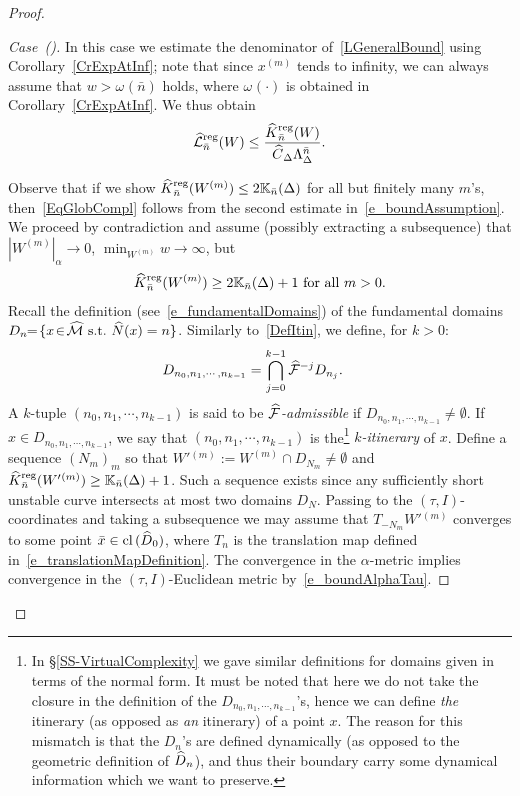 \documentclass[AHL, Unicode, longabstracts,published]{cedram}
\newcommand{\st}{\ \text{s.t.}\ }
\newcommand{\cl}[1]{\mathrm{cl}\,#1}
\newcommand{\LC}{\mathbb{K}}
\newcommand{\cm}{\mathcal{F}}
\newcommand{\csp}{\mathcal{M}}
\newcommand{\cmp}{\hat\cm}
\newcommand{\cspi}{\widehat{\csp}}
\newcommand{\brn}{\bar{n}}
\newcommand{\brx}{\bar{x}}
\newcommand{\hkreg}{\hat{K}^\text{reg}}
\newcommand{\hzreg}{\hat{\cL}^\text{reg}}
\newcommand{\law}[1]{\omega_{#1}}
\newcommand{\adm}{_{\alpha^{+}}}
\newcommand{\admName}{\alpha^{+}}
\newcommand{\Np}{\hat N}
\newcommand{\cL}{\mathcal{L}}
\newcommand{\privSeq}[2]{#1^{(#2)}}
\newcommand{\Wseq}[1]{\privSeq{W}{#1}}
\newcommand{\Wpseq}[1]{\privSeq{W'{}}{#1}}
\newcommand{\Dom}{D}
\newcommand{\hDom}{\hat D}
\renewcommand{\admName}{\alpha}
\renewcommand{\adm}{_{\alpha}}
\newcounter{casecount}
\renewcommand*\thecasecount{(\alph{casecount})}
\newenvironment{case}{\refstepcounter{casecount}\begin{proof}[{Case~\thecasecount}]}{\let\qed\relax\end{proof}}
\let\oldhat\hat
\renewcommand*{\hat}[1]{\mathchoice{\widehat{#1}}{\widehat{#1}}{\oldhat{#1}}{\oldhat{#1}}}
\begin{document}
\begin{proof}
\begin{case}
In this case we estimate the denominator of~\eqref{LGeneralBound} using Corollary~\ref{CrExpAtInf}; note that since $x^{(m)}$ tends to infinity, we can always assume that $w > \law{}(\bar n)$ holds, where $\law{}(\cdot)$ is obtained in Corollary~\ref{CrExpAtInf}. We thus obtain
\begin{align*}
\hzreg_{\brn}(W) \leq \frac{\hkreg_{\brn}(W)}{\hat{C}_{\Delta} \Lambda_\Delta^{\brn}}.
\end{align*}

Observe that if we show $\hkreg_{\bar n}(W^{(m)}) \leq 2\LC_{\bar n}(\Delta)$ for all but finitely many $m$'s, then~\eqref{EqGlobCompl} follows from the second estimate in~\eqref{e_boundAssumption}. We proceed by contradiction and assume (possibly extracting a subsequence) that $|\Wseq{m}|\adm\to 0$, $ \min_{\Wseq{m}} w\to\infty$, but
\begin{align*}
\hkreg_{\bar n}(\Wseq{m})\geq 2\LC_{\bar n}(\Delta)+1 \text{ for all }m > 0.
\end{align*}
Recall the definition (see~\eqref{e_fundamentalDomains}) of the fundamental domains $\Dom_n\!\!=\! \{x\!\in\!\cspi\st \Np(x) = n\}$. Similarly to~\eqref{DefItin}, we define, for $k > 0$:
\begin{align*}
\Dom_{n_0,n_1,\cdots,n_{k-1}} &= \bigcap_{j = 0}^{k-1}\cmp^{-j}\Dom_{n_j}.
\end{align*}
A $k$-tuple $(n_0,n_1,\!\cdots\!,n_{k-1})$ is said to be
\emph{$\cmp$-admissible} if $\Dom_{n_0,n_1,\cdots,n_{k-1}}\!\!\ne\!\emptyset$. If $x\in\Dom_{n_0,n_1,\cdots,n_{k-1}}$, we say that $(n_0,n_1,\cdots,n_{k-1})$ is the\footnote{In
\S\ref{SS-VirtualComplexity} we gave similar definitions for domains given in terms of the normal form. It must be noted that here we do not take the closure in the definition of the $\Dom_{n_0,n_1,\cdots,n_{k-1}}$'s, hence we can define \emph{the} itinerary (as opposed as \emph{an} itinerary) of a point $x$. The reason for this mismatch is that the $\Dom_n$'s are defined dynamically (as opposed to the geometric definition of $\hDom_n$), and thus their boundary carry some dynamical information which we want to preserve.} 
\emph{$k$-itinerary} of $x$. Define a sequence $(N_m)_m$ so that $\Wpseq{m} \!\!:= \Wseq{m}\cap D_{N_m}\ne\emptyset$ and $\hkreg_{\bar n}(\Wpseq{m})\ge \LC_{\bar n}(\Delta)+1$. Such a sequence exists since any sufficiently short unstable curve intersects at most two domains $D_N$. Passing to the $(\tau, I)$-coordinates and taking a subsequence we may assume that $T_{-N_m} \Wpseq{m}$ converges to some point $\brx\in \cl(\hDom_0)$, where $T_n$ is the translation map defined in~\eqref{e_translationMapDefinition}. The convergence in the $\admName$-metric implies convergence in the $(\tau,I)$-Euclidean metric by~\eqref{e_boundAlphaTau}.


\end{case}
\end{proof}
\end{document}
